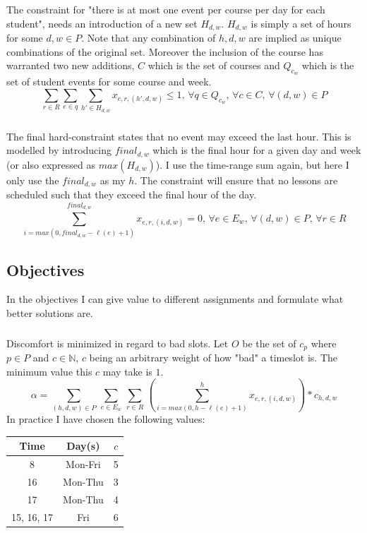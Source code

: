 \documentclass{article}
\begin{document}
    \subsubsection{}
    The constraint for "there is at most one event per course per day for each student", needs an introduction of a new set $H_{d,w}$.
    $H_{d,w}$ is simply a set of hours for some $d,w \in P$.
    Note that any combination of $h,d,w$ are implied as unique combinations of the original set.
    Moreover the inclusion of the course has warranted two new additions, $C$ which is the set of courses and $Q_{c_w}$ which is the set of student events for some course and week.
    $$\sum_{r \in R} \sum_{e \in q} \sum_{h' \in H_{d,w}} x_{e,r,(h',d,w)} \leq 1, \, \forall q \in Q_{c_w}, \, \forall c \in C , \, \forall (d,w) \in P$$
    \subsubsection{}
    The final hard-constraint states that no event may exceed the last hour.
    This is modelled by introducing $final_{d,w}$ which is the final hour for a given day and week (or also expressed as $max(H_{d,w})$).
    I use the time-range sum again, but here I only use the $final_{d,w}$ as my $h$.
    The constraint will ensure that no lessons are scheduled such that they exceed the final hour of the day.
    $$\sum^{final_{d,w}}_{i=max(0, final_{d,w} - \ell(e) + 1)} x_{e,r,(i,d,w)} = 0, \, \forall e \in E_w , \, \forall (d,w) \in P , \, \forall r \in R$$
    \subsection{Objectives}
    In the objectives I can give value to different assignments and formulate what better solutions are.
    \subsubsection{}
    Discomfort is minimized in regard to bad slots.
    Let $O$ be the set of $c_p$ where $p \in P$ and $c \in \mathbb{N}$, $c$ being an arbitrary weight of how "bad" a timeslot is.
    The minimum value this $c$ may take is $1$.
    $$\alpha = \sum_{(h,d,w) \in P} \, \sum_{e \in E_w} \, \sum_{r \in R} \, \left( \sum^h_{i=max(0, h - \ell(e) + 1)} x_{e,r,(i,d,w)} \right) * c_{h,d,w}$$
    In practice I have chosen the following values:
    \begin{center}
        \begin{tabular}{|c | c | c |}
            \hline
            Time & Day(s) & $c$ \\ [0.5ex]
            \hline
            8 & Mon-Fri &  5  \\
            \hline
            16 & Mon-Thu & 3  \\
            \hline
            17 & Mon-Thu & 4  \\
            \hline
            15, 16, 17 & Fri & 6  \\ [1ex]
            \hline
        \end{tabular}
    \end{center}
\end{document}
